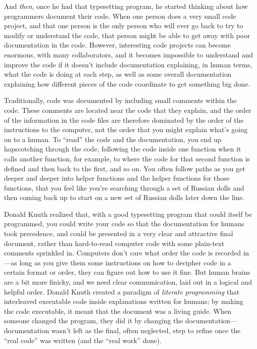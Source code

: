 \documentclass[]{tufte-book}
\begin{document}
And \emph{then}, once he had that typesetting program, he started thinking about how
programmers document their code. When one person does a very small code project,
and that one person is the only person who will ever go back to try to modify or
understand the code, that person might be able to get away with poor
documentation in the code. However, interesting code projects can become
enormous, with many collaborators, and it becomes impossible to understand and
improve the code if it doesn't include documentation explaining, in human terms,
what the code is doing at each step, as well as some overall documentation
explaining how different pieces of the code coordinate to get something big
done.

Traditionally, code was documented by including small comments within the code. These comments
are located near the code that they explain, and the order of the information in the
code files are therefore dominated by the order of the instructions to the computer,
not the order that you might explain what's going on to a human. To ``read'' the code and
the documentation, you end up hopscotching through the code, following the code inside
one function when it calls another function, for example, to where the code for that
second function is defined and then back to the first, and so on. You often follow paths as
you get deeper and deeper into helper functions and the helper functions for those functions,
that you feel like you're searching through a set of Russian dolls and then coming back up
to start on a new set of Russian dolls later down the line.

Donald Knuth realized that, with a good typesetting program that could itself be programmed,
you could write your code so that the documentation for humans took precedence, and could
be presented in a very clear and attractive final document, rather than hard-to-read
computer code with some plain-text comments sprinkled in. Computers don't care what order
the code is recorded in---as long as you give them some instructions on how to decipher
code in a certain format or order, they can figure out how to use it fine. But human brains
are a bit more finicky, and we need clear communication, laid out in a logical and helpful
order. Donald Knuth created a paradigm of \emph{literate programming} that interleaved
executable code inside explanations written for humans; by making the code executable, it
meant that the document was a living guide. When someone changed the program, they did
it by changing the documentation---documentation wasn't left as the final, often neglected,
step to refine once the ``real code'' was written (and the ``real work'' done).
\end{document}
